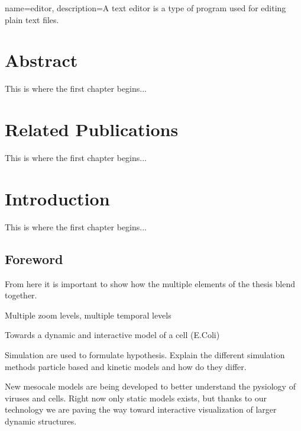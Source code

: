 
{
	name={editor},
	description={A text editor is a type of program used for editing plain text files.}
}

\chapter{Abstract}


This is where the first chapter begins...


\chapter{Related Publications}


This is where the first chapter begins...

\chapter{Introduction}


This is where the first chapter begins...

\section{Foreword}

From here it is important to show how the multiple elements of the thesis blend together.

Multiple zoom levels, multiple temporal levels

Towards a dynamic and interactive model of a cell (E.Coli)

Simulation are used to formulate hypothesis.
Explain the different simulation methods particle based and kinetic models and how do they differ.

New mesocale models are being developed to better understand the pysiology of viruses and cells.
Right now only static models exists, but thanks to our technology we are paving the way toward interactive visualization of larger dynamic structures.



%

